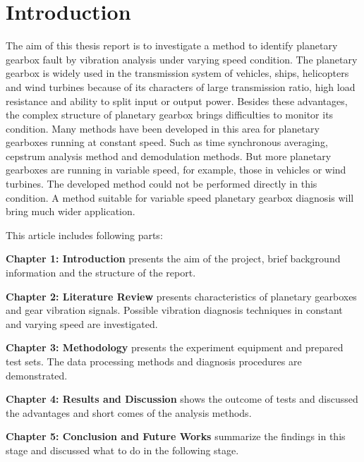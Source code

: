 \chapter{Introduction}\label{ch:introduction}

The aim of this thesis report is to investigate a method to identify planetary gearbox fault by vibration analysis under varying speed condition. The planetary gearbox is widely used in the transmission system of vehicles, ships, helicopters and wind turbines because of its characters of large transmission ratio, high load resistance and ability to split input or output power. Besides these advantages, the complex structure of planetary gearbox brings difficulties to monitor its condition. Many methods have been developed in this area for planetary gearboxes running at constant speed. Such as time synchronous averaging, cepstrum analysis method and demodulation methods. But more planetary gearboxes are running in variable speed, for example, those in vehicles or wind turbines. The developed method could not be performed directly in this condition. A method suitable for variable speed planetary gearbox diagnosis will bring much wider application.

This article includes following parts:

\textbf{Chapter 1: Introduction} presents the aim of the project, brief background information and the structure of the report.

\textbf{Chapter 2: Literature Review} presents characteristics of planetary gearboxes and gear vibration signals. Possible vibration diagnosis techniques in constant and varying speed are investigated.

\textbf{Chapter 3: Methodology} presents the experiment equipment and prepared test sets. The data processing methods and diagnosis procedures are demonstrated.

\textbf{Chapter 4: Results and Discussion} shows the outcome of tests and discussed the advantages and short comes of the analysis methods.

\textbf{Chapter 5: Conclusion and Future Works} summarize the findings in this stage and discussed what to do in the following stage.




